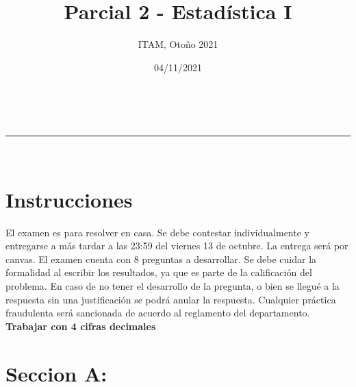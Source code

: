 \documentclass[addpoints]{exam}
\makeatletter
\newcommand{\linia}{\rule{\linewidth}{0.5pt}}
\theoremstyle{mytheor}
\renewcommand{\maketitle}{
    \begin{center}
    \vspace{2ex}
    {\huge \textsc{\@title}}
    \vspace{1ex}
    \\
    \linia\\
    \@author \hfill \@date
    \vspace{4ex}
    \end{center}
  }
\makeatother
\begin{document}
  
  \title{Parcial 2 - Estadística I}
  
  \author{ITAM, Otoño 2021}
  
  \date{04/11/2021}
  
  \maketitle
  
  \section*{Instrucciones}
  El examen es para resolver en casa. Se debe contestar individualmente y entregarse a más tardar a las 23:59 del viernes 13 de octubre. La entrega será por canvas. El examen cuenta con 8 preguntas a desarrollar. Se debe cuidar la formalidad al escribir los resultados, ya que es parte de la calificación del problema. En caso de no tener el desarrollo de la pregunta, o bien se llegué a la respuesta sin una justificación se podrá anular la respuesta. Cualquier práctica fraudulenta será sancionada de acuerdo al reglamento del departamento. \textbf{Trabajar con 4 cifras decimales}
  
\vspace{10pt}

  \section*{Seccion A: }
  
\end{document}
